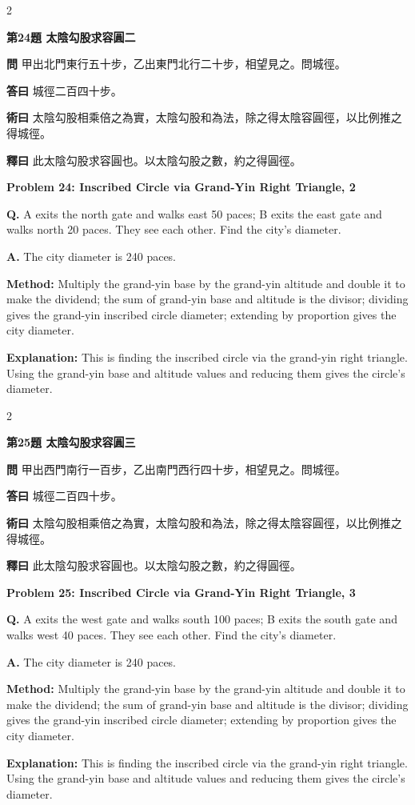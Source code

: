 \documentclass[11pt,a4paper]{article}
\newcommand{\wen}[1]{\noindent\textbf{問} #1\par\smallskip}
\newcommand{\da}[1]{\noindent\textbf{答曰} #1\par\smallskip}
\newcommand{\shu}[1]{\noindent\textbf{術曰} #1\par\smallskip}
\newcommand{\shi}[1]{\noindent\textbf{釋曰} #1\par\smallskip}
\newcommand{\wenE}[1]{\noindent\textbf{Q.} #1\par\smallskip}
\newcommand{\daE}[1]{\noindent\textbf{A.} #1\par\smallskip}
\newcommand{\shuE}[1]{\noindent\textbf{Method:} #1\par\smallskip}
\newcommand{\shiE}[1]{\noindent\textbf{Explanation:} #1\par\smallskip}
\begin{document}
\bigskip

\begin{paracol}{2}

\noindent\textbf{第24題 太陰勾股求容圓二}

\wen{甲出北門東行五十步，乙出東門北行二十步，相望見之。問城徑。}
\da{城徑二百四十步。}
\shu{太陰勾股相乘倍之為實，太陰勾股和為法，除之得太陰容圓徑，以比例推之得城徑。}
\shi{此太陰勾股求容圓也。以太陰勾股之數，約之得圓徑。}

\switchcolumn

\noindent\textbf{Problem 24: Inscribed Circle via Grand-Yin Right Triangle, 2}

\wenE{A exits the north gate and walks east 50 paces; B exits the east gate and walks north 20 paces. They see each other. Find the city's diameter.}
\daE{The city diameter is 240 paces.}
\shuE{Multiply the grand-yin base by the grand-yin altitude and double it to make the dividend; the sum of grand-yin base and altitude is the divisor; dividing gives the grand-yin inscribed circle diameter; extending by proportion gives the city diameter.}
\shiE{This is finding the inscribed circle via the grand-yin right triangle. Using the grand-yin base and altitude values and reducing them gives the circle's diameter.}

\end{paracol}

\bigskip

\begin{paracol}{2}

\noindent\textbf{第25題 太陰勾股求容圓三}

\wen{甲出西門南行一百步，乙出南門西行四十步，相望見之。問城徑。}
\da{城徑二百四十步。}
\shu{太陰勾股相乘倍之為實，太陰勾股和為法，除之得太陰容圓徑，以比例推之得城徑。}
\shi{此太陰勾股求容圓也。以太陰勾股之數，約之得圓徑。}

\switchcolumn

\noindent\textbf{Problem 25: Inscribed Circle via Grand-Yin Right Triangle, 3}

\wenE{A exits the west gate and walks south 100 paces; B exits the south gate and walks west 40 paces. They see each other. Find the city's diameter.}
\daE{The city diameter is 240 paces.}
\shuE{Multiply the grand-yin base by the grand-yin altitude and double it to make the dividend; the sum of grand-yin base and altitude is the divisor; dividing gives the grand-yin inscribed circle diameter; extending by proportion gives the city diameter.}
\shiE{This is finding the inscribed circle via the grand-yin right triangle. Using the grand-yin base and altitude values and reducing them gives the circle's diameter.}

\end{paracol}
\end{document}
